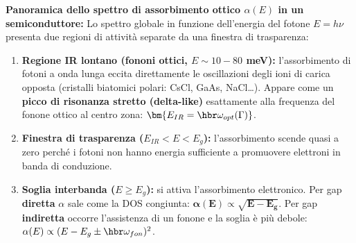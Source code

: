 
\vspace{0.3cm}

\textbf{Panoramica dello spettro di assorbimento ottico $\alpha(E)$ in un semiconduttore:} 
Lo spettro globale in funzione dell'energia del fotone $E=h\nu$ presenta due regioni di attività separate da una finestra di trasparenza:
\begin{enumerate}
    \item \textbf{Regione IR lontano (fononi ottici, $E\sim10-80$ meV):} l'assorbimento di fotoni a onda lunga eccita direttamente le oscillazioni degli ioni di carica opposta (cristalli biatomici polari: CsCl, GaAs, NaCl\dots). Appare come un \textbf{picco di risonanza stretto (delta-like)} esattamente alla frequenza del fonone ottico al centro zona: $\bm{E_{IR}=\hbr\omega_{opt}(\Gamma)}$.
    \item \textbf{Finestra di trasparenza ($E_{IR}<E<E_g$):} l'assorbimento scende quasi a zero perché i fotoni non hanno energia sufficiente a promuovere elettroni in banda di conduzione.
    \item \textbf{Soglia interbanda ($E\ge E_g$):} si attiva l'assorbimento elettronico. Per gap \textbf{diretta} $\alpha$ sale come la DOS congiunta: $\bm{\alpha(E)\propto\sqrt{E-E_g}}$. Per gap \textbf{indiretta} occorre l'assistenza di un fonone e la soglia è più debole: $\alpha(E)\propto(E-E_g\pm\hbr\omega_{fon})^2$.
\end{enumerate}

